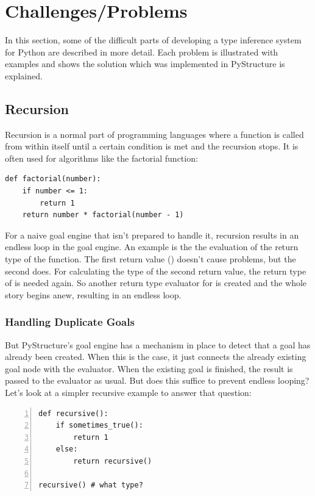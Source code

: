 \documentclass[12pt,halfparskip,DIV11,BCOR10mm]{scrreprt}
\begin{document}
\section{Challenges/Problems}

In this section, some of the difficult parts of developing a type inference system for Python are described in more detail. Each problem is illustrated with examples and shows the solution which was implemented in PyStructure is explained.

\subsection{Recursion}


Recursion is a normal part of programming languages where a function is called from within itself until a certain condition is met and the recursion stops. It is often used for algorithms like the factorial function:

\begin{lstlisting}
def factorial(number):
    if number <= 1:
        return 1
    return number * factorial(number - 1)
\end{lstlisting}

For a naive goal engine that isn't prepared to handle it, recursion results in an endless loop in the goal engine. An example is the the evaluation of the return type of the  function. The first return value () doesn't cause problems, but the second does. For calculating the type of the second return value, the return type of  is needed again. So another return type evaluator for  is created and the whole story begins anew, resulting in an endless loop.

\subsubsection{Handling Duplicate Goals}

But PyStructure's goal engine has a mechanism in place to detect that a goal has already been created. When this is the case, it just connects the already existing goal node with the evaluator. When the existing goal is finished, the result is passed to the evaluator as usual. But does this suffice to prevent endless looping? Let's look at a simpler recursive example to answer that question:

\begin{lstlisting}[numbers=left]
def recursive():
    if sometimes_true():
        return 1
    else:
        return recursive()

recursive() # what type?
\end{lstlisting}
\end{document}
